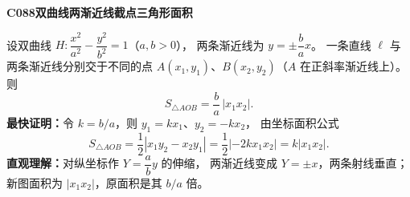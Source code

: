 \textbf{C088\quad 双曲线两渐近线截点三角形面积}

设双曲线 $H:\dfrac{x^2}{a^2}-\dfrac{y^2}{b^2}=1$（$a,b>0$），
两条渐近线为 $y=\pm\dfrac ba x$。
一条直线 $\ell$ 与两条渐近线分别交于不同的点
$A(x_1,y_1)$、$B(x_2,y_2)$（$A$ 在正斜率渐近线上）。
则
\[
\boxed{S_{\triangle AOB}=\frac ba\,|x_1x_2|}.
\]
\textbf{最快证明：}令 $k=b/a$，则 $y_1=kx_1$、$y_2=-kx_2$，
由坐标面积公式
\[
S_{\triangle AOB}=\frac12|x_1y_2-x_2y_1|
=\frac12|-2kx_1x_2|=k|x_1x_2|.
\]
\textbf{直观理解：}对纵坐标作 $Y=\dfrac ab y$ 的伸缩，
两渐近线变成 $Y=\pm x$，两条射线垂直；
新图面积为 $|x_1x_2|$，原面积是其 $b/a$ 倍。
